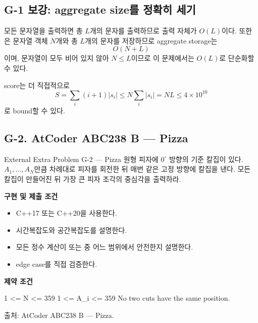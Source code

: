 \subsection{G-1 보강: aggregate size를 정확히 세기}
모든 문자열을 출력하면 총 $L$개의 문자를 출력하므로 출력 자체가 $O(L)$이다. 또한 은 문자열 객체 $N$개와 총 $L$개의 문자를 저장하므로 aggregate storage는
\[
O(N+L)
\]
이며, 문자열이 모두 비어 있지 않아 $N\le L$이므로 이 문제에서는 $O(L)$로 단순화할 수 있다.

score는 더 직접적으로
\[
S=\sum_i(i+1)|s_i|\le N\sum_i|s_i|=NL\le4\times10^{10}
\]
로 bound할 수 있다.

\subsection{G-2. AtCoder ABC238 B --- Pizza}
\begin{problembox}{External Extra Problem G-2 --- Pizza}
원형 피자에 $0^\circ$ 방향의 기준 칼집이 있다. $A_1,\dots,A_N$만큼 차례대로 피자를 회전한 뒤 매번 같은 고정 방향에 칼집을 낸다. 모든 칼집이 만들어진 뒤 가장 큰 피자 조각의 중심각을 출력하라.

\textbf{구현 및 제출 조건}
\begin{itemize}
  \item C++17 또는 C++20을 사용한다.
  \item 시간복잡도와 공간복잡도를 설명한다.
  \item 모든 정수 계산이  또는  중 어느 범위에서 안전한지 설명한다.
  \item edge case를 직접 검증한다.
\end{itemize}

\textbf{제약 조건}
\begin{TextBlock}
1 <= N <= 359
1 <= A_i <= 359
No two cuts have the same position.
\end{TextBlock}

출처: AtCoder ABC238 B --- Pizza.
\end{problembox}

